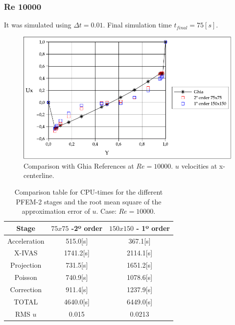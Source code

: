 \documentclass[a4paper,conference]{IEEEtran}
\begin{document}
\newpage

\subsubsection{Re 10000}


It was simulated using $\Delta t = 0.01$. Final simulation time $t_{final} = 75[s]$.

\begin{figure}[htbp]
  \begin{center}
      \includegraphics[width=.85\linewidth]{images/Re_10000_Ux.pdf}
  \end{center}
  \caption{\label{fg:Re10000} Comparison with Ghia References at $Re=10000$. $u$ velocities at x-centerline.}
\end{figure}


\begin{table}[htbp]
\begin{center}
{\footnotesize
\begin{tabular}[h]{||c|c|c||}
    \hline
      Stage & $75x75$  -2º order & $150x150$ - 1º order\\
      \hline
      \hline
	Acceleration & 515.0[s]& 367.1[s]\\
	X-IVAS & 1741.2[s]& 2114.1[s] \\
	Projection & 731.5[s]& 1651.2[s]\\
	Poisson & 740.9[s]& 1078.6[s]\\
	Correction & 911.4[s]& 1237.9[s]\\
      \hline
	TOTAL & 4640.0[s]& 6449.0[s]\\
      \hline
      \hline
	RMS $u$ & 0.015 & 0.0213 \\
      \hline
      \hline
\end{tabular}
}
\caption{\label{Tabla:times_Re_10000} Comparison table for CPU-times for the different PFEM-2 stages and the root mean square of the approximation error of $u$. Case: $Re=10000$.}
\end{center}
\end{table}
\end{document}
